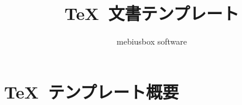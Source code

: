 

\title{\TeX\ 文書テンプレート}
\author{mebiusbox software}

    \pagestyle{empty} 
    \maketitle
    \setcounter{tocdepth}{2}
    \tableofcontents
    \cleardoublepage
    \pagestyle{\pixypagestyle}

    \chapter{\TeX\ テンプレート概要}
    
    
    
    
    
    


